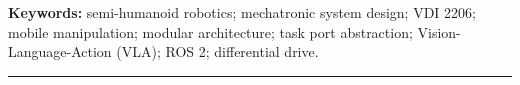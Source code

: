\documentclass[10pt,a4paper]{article}
\begin{document}
\noindent\textbf{Keywords:} semi-humanoid robotics; mechatronic system design; VDI 2206; mobile manipulation; modular architecture; task port abstraction; Vision-Language-Action (VLA); ROS 2; differential drive.

\vspace{0.8em}
\tableofcontents
\vspace{1.0em}
\hrule
\vspace{1.0em}













\end{document}
